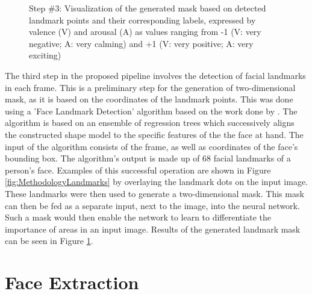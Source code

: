 \begin{figure}[H]
  \hfill
  \caption[ER pipeline step \#3: Mask]{Step \#3: Visualization of the generated mask based on detected landmark points and their corresponding labels, expressed by valence (V) and arousal (A) as values ranging from -1 (V: very negative; A: very calming) and +1 (V: very positive; A: very exciting)}
  \label{fig:MethodologyMask}
\end{figure}

The third step in the proposed pipeline involves the detection of facial landmarks in each frame. This is a preliminary step for the generation of two-dimensional mask, as it is based on the coordinates of the landmark points.
\newline\newline
This was done using a 'Face Landmark Detection' algorithm based on the work done by \citet{Kazemi:2014:ShapePredictor}. The algorithm is based on an ensemble of regression trees which successively aligns the constructed shape model to the specific features of the the face at hand.
\newline\newline
The input of the algorithm consists of the frame, as well as coordinates of the face's bounding box. The algorithm's output is made up of 68 facial landmarks of a person's face. Examples of this successful operation are shown in Figure \ref{fig:MethodologyLandmarks} by overlaying the landmark dots on the input image.
\newline\newline
These landmarks were then used to generate a two-dimensional mask. This mask can then be fed as a separate input, next to the image, into the neural network. Such a mask would then enable the network to learn to differentiate the importance of areas in an input image. Results of the generated landmark mask can be seen in Figure \ref{fig:MethodologyMask}.


\section{Face Extraction}

